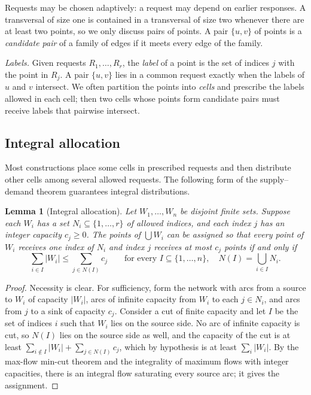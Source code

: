 \documentclass[11pt]{article}
\numberwithin{equation}{section}
\newtheorem{lemma}[theorem]{Lemma}
\theoremstyle{definition}
\theoremstyle{remark}
\begin{document}
Requests may be chosen adaptively: a request may depend on earlier
responses. A transversal of size one is contained in a transversal of
size two whenever there are at least two points, so we only discuss
pairs of points. A pair $\{u,v\}$ of points is a \emph{candidate pair}
of a family of edges if it meets every edge of the family.

\emph{Labels.} Given requests $R_1,\dots,R_r$, the \emph{label} of a
point is the set of indices $j$ with the point in $R_j$. A pair $\{u,v\}$
lies in a common request exactly when the labels of $u$ and $v$
intersect. We often partition the points into \emph{cells} and
prescribe the labels allowed in each cell; then two cells whose points
form candidate pairs must receive labels that pairwise intersect.

\subsection{Integral allocation}
Most constructions place some cells in prescribed requests and then
distribute other cells among several allowed requests. The following
form of the supply--demand theorem guarantees integral distributions.

\begin{lemma}[Integral allocation]\label{lem:allocation}
Let $W_1,\dots,W_n$ be disjoint finite sets. Suppose each $W_i$ has a
set $N_i\subseteq\{1,\dots,r\}$ of allowed indices, and each index $j$
has an integer capacity $c_j\ge0$. The points of $\bigcup W_i$ can be
assigned so that every point of $W_i$ receives one index of $N_i$ and
index $j$ receives at most $c_j$ points if and only if
\[
 \sum_{i\in I}|W_i|\le\sum_{j\in N(I)}c_j
 \qquad\text{for every } I\subseteq\{1,\dots,n\},\quad
 N(I)=\bigcup_{i\in I}N_i .
\]
\end{lemma}
\begin{proof}
Necessity is clear. For sufficiency, form the network with arcs from a
source to $W_i$ of capacity $|W_i|$, arcs of infinite capacity from $W_i$
to each $j\in N_i$, and arcs from $j$ to a sink of capacity $c_j$.
Consider a cut of finite capacity and let $I$ be the set of indices $i$
such that $W_i$ lies on the source side. No arc of infinite capacity is
cut, so $N(I)$ lies on the source side as well, and the capacity of the
cut is at least $\sum_{i\notin I}|W_i|+\sum_{j\in N(I)}c_j$, which by
hypothesis is at least $\sum_i|W_i|$. By the max-flow min-cut theorem and the integrality
of maximum flows with integer capacities, there is an integral flow
saturating every source arc; it gives the assignment.
\end{proof}
\end{document}
